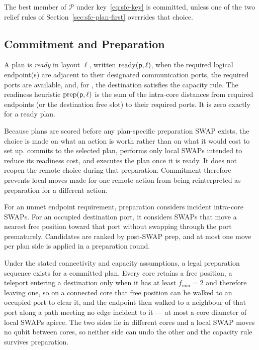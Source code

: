 The best member of $\mathcal P$ under key~\eqref{eq:sfc-key} is
committed, unless one of the two relief rules of
Section~\ref{sec:sfc-plan-first} overrides that choice.

\subsection{Commitment and Preparation}
\label{sec:sfc-commit}

A plan is \emph{ready} in layout $\ell$, written
$\mathrm{ready}(\mathsf{p},\ell)$, when the required logical endpoint(s) are
adjacent to their designated communication ports, the required ports are
available, and, for \TeleData{}, the destination satisfies the capacity rule.
The readiness heuristic $\mathrm{prep}(\mathsf{p},\ell)$ is the sum of the
intra-core distances from required endpoints (or the destination free slot)
to their required ports.  It is zero exactly for a ready plan.  

Because plans are scored before any plan-specific preparation SWAP
exists, the choice is made on what an action is worth rather than on what it
would cost to set up.  \PORTER{} commits to the
selected plan, performs only local SWAPs intended to reduce its readiness
cost, and executes the plan once it is ready.  It does not reopen the remote
choice during that preparation.  Commitment therefore prevents local moves
made for one remote action from being reinterpreted as preparation for a
different action.

For an unmet endpoint requirement, preparation considers incident
intra-core SWAPs.  For an occupied \TeleData{} destination port, it considers
SWAPs that move a nearest free position toward that port without swapping
through the port prematurely.  Candidates are ranked by post-SWAP
$\mathrm{prep}$, and at most one move per plan side is applied in a
preparation round.

Under the stated connectivity and capacity assumptions, a legal preparation
sequence exists for a committed plan.  Every core retains a free position,
a teleport entering a destination only when it has at least
$f_\mathrm{min}=2$ and therefore leaving one, so on a connected core that
free position can be walked to an occupied port to clear it, and the endpoint
then walked to a neighbour of that port along a path meeting no edge incident
to it --- at most a core diameter of local SWAPs apiece.  The two sides lie in
different cores and a local SWAP moves no qubit between cores, so neither side
can undo the other and the capacity rule survives preparation.

